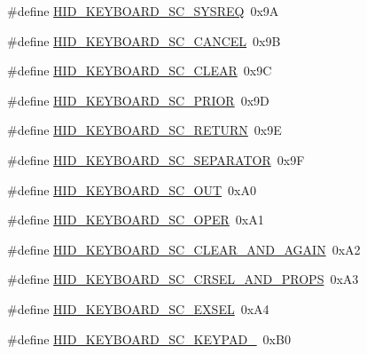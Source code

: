 \begin{DoxyCompactItemize}
\item 
\#define \hyperlink{group__Group__USBClassHIDCommon_ga6c32ab83e96b9bd6f5c7750838207d1e}{H\+I\+D\+\_\+\+K\+E\+Y\+B\+O\+A\+R\+D\+\_\+\+S\+C\+\_\+\+S\+Y\+S\+R\+EQ}~0x9A
\item 
\#define \hyperlink{group__Group__USBClassHIDCommon_ga25a7fd02272e488fb7bd1c6529056176}{H\+I\+D\+\_\+\+K\+E\+Y\+B\+O\+A\+R\+D\+\_\+\+S\+C\+\_\+\+C\+A\+N\+C\+EL}~0x9B
\item 
\#define \hyperlink{group__Group__USBClassHIDCommon_ga3765ad26dfee104f9f65244d181adba8}{H\+I\+D\+\_\+\+K\+E\+Y\+B\+O\+A\+R\+D\+\_\+\+S\+C\+\_\+\+C\+L\+E\+AR}~0x9C
\item 
\#define \hyperlink{group__Group__USBClassHIDCommon_gad02665934ed8eb221a71164d2d67f64e}{H\+I\+D\+\_\+\+K\+E\+Y\+B\+O\+A\+R\+D\+\_\+\+S\+C\+\_\+\+P\+R\+I\+OR}~0x9D
\item 
\#define \hyperlink{group__Group__USBClassHIDCommon_ga844279bbfe96f475421088737dd21dc2}{H\+I\+D\+\_\+\+K\+E\+Y\+B\+O\+A\+R\+D\+\_\+\+S\+C\+\_\+\+R\+E\+T\+U\+RN}~0x9E
\item 
\#define \hyperlink{group__Group__USBClassHIDCommon_ga28fe3ed747a888a8d10547f258b95b8e}{H\+I\+D\+\_\+\+K\+E\+Y\+B\+O\+A\+R\+D\+\_\+\+S\+C\+\_\+\+S\+E\+P\+A\+R\+A\+T\+OR}~0x9F
\item 
\#define \hyperlink{group__Group__USBClassHIDCommon_ga8586b614378d47afbd60ef6c78895649}{H\+I\+D\+\_\+\+K\+E\+Y\+B\+O\+A\+R\+D\+\_\+\+S\+C\+\_\+\+O\+UT}~0x\+A0
\item 
\#define \hyperlink{group__Group__USBClassHIDCommon_gaea071d5d37b24b195018b21cc5405116}{H\+I\+D\+\_\+\+K\+E\+Y\+B\+O\+A\+R\+D\+\_\+\+S\+C\+\_\+\+O\+P\+ER}~0x\+A1
\item 
\#define \hyperlink{group__Group__USBClassHIDCommon_ga41ed1a5c091c4bf5d03343746ed291e9}{H\+I\+D\+\_\+\+K\+E\+Y\+B\+O\+A\+R\+D\+\_\+\+S\+C\+\_\+\+C\+L\+E\+A\+R\+\_\+\+A\+N\+D\+\_\+\+A\+G\+A\+IN}~0x\+A2
\item 
\#define \hyperlink{group__Group__USBClassHIDCommon_ga996f908b2ed2764dfb850ba1e2ba6ccf}{H\+I\+D\+\_\+\+K\+E\+Y\+B\+O\+A\+R\+D\+\_\+\+S\+C\+\_\+\+C\+R\+S\+E\+L\+\_\+\+A\+N\+D\+\_\+\+P\+R\+O\+PS}~0x\+A3
\item 
\#define \hyperlink{group__Group__USBClassHIDCommon_ga6f748724d45a7a84b9ba8c0fffc9d945}{H\+I\+D\+\_\+\+K\+E\+Y\+B\+O\+A\+R\+D\+\_\+\+S\+C\+\_\+\+E\+X\+S\+EL}~0x\+A4
\item 
\#define \hyperlink{group__Group__USBClassHIDCommon_ga2590bee7bd95e38afaeb06038bc26e42}{H\+I\+D\+\_\+\+K\+E\+Y\+B\+O\+A\+R\+D\+\_\+\+S\+C\+\_\+\+K\+E\+Y\+P\+A\+D\+\_}~0x\+B0

\end{DoxyCompactItemize}
